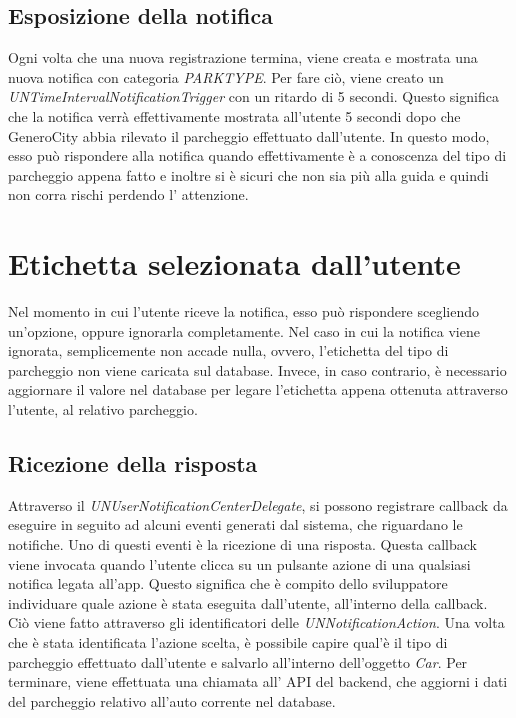 \subsection{Esposizione della notifica}

Ogni volta che una nuova registrazione termina, viene creata e mostrata una nuova notifica
con categoria \emph{PARKTYPE}. Per fare ciò, viene creato un
\emph{UNTimeIntervalNotificationTrigger} con un ritardo di 5 secondi. Questo significa che
la notifica verrà effettivamente mostrata all'utente 5 secondi dopo che GeneroCity abbia
rilevato il parcheggio effettuato dall'utente. In questo modo, esso può rispondere alla
notifica quando effettivamente è a conoscenza del tipo di parcheggio appena fatto e
inoltre si è sicuri che non sia più alla guida e quindi non corra rischi perdendo l'
attenzione. %

\section{Etichetta selezionata dall'utente}

Nel momento in cui l'utente riceve la notifica, esso può rispondere scegliendo un'opzione,
oppure ignorarla completamente. Nel caso in cui la notifica viene ignorata, semplicemente 
non accade nulla, ovvero, l'etichetta del tipo di parcheggio non viene caricata sul
database. Invece, in caso contrario, è necessario aggiornare il valore nel database per 
legare l'etichetta appena ottenuta attraverso l'utente, al relativo parcheggio.

\subsection{Ricezione della risposta}

Attraverso il \emph{UNUserNotificationCenterDelegate}, si possono registrare callback 
da eseguire in seguito ad alcuni eventi generati dal sistema, che riguardano le notifiche.
Uno di questi eventi è la ricezione di una risposta. Questa callback viene invocata quando
l'utente clicca su un pulsante azione di una qualsiasi notifica legata all'app.
Questo significa che è compito dello sviluppatore individuare quale azione è stata eseguita
dall'utente, all'interno della callback. Ciò viene fatto attraverso gli identificatori
delle \emph{UNNotificationAction}. Una volta che è stata identificata l'azione scelta,
è possibile capire qual'è il tipo di parcheggio effettuato dall'utente e salvarlo
all'interno dell'oggetto \emph{Car}. Per terminare, viene effettuata una chiamata all'
API del backend, che aggiorni i dati del parcheggio relativo all'auto corrente
nel database.